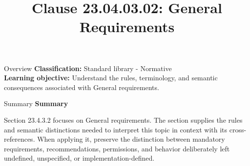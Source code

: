 \documentclass[10pt,letterpaper]{article}
\title{Clause 23.04.03.02: General Requirements}
\author{}
\date{}
\begin{document}
\maketitle
\begin{CornellOverviewBox}{Overview}
\textbf{Classification:} Standard library - Normative\\[2pt]
\textbf{Learning objective:} Understand the rules, terminology, and semantic consequences associated with General requirements.
\end{CornellOverviewBox}\begin{CornellSummaryBox}{Summary}
{\sffamily\bfseries\color{Accent} Summary}\par\vspace{3pt}Section 23.4.3.2 focuses on General requirements. The section supplies the rules and semantic distinctions needed to interpret this topic in context with its cross-references. When applying it, preserve the distinction between mandatory requirements, recommendations, permissions, and behavior deliberately left undefined, unspecified, or implementation-defined.
\end{CornellSummaryBox}
\end{document}
